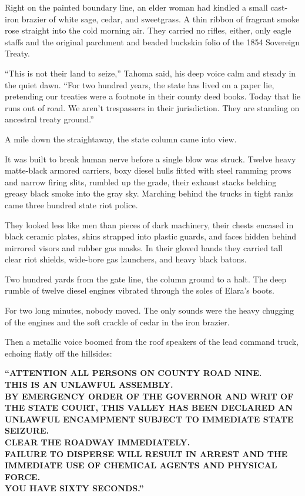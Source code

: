 Right on the painted boundary line, an elder woman had kindled a small cast-iron brazier of white sage, cedar, and sweetgrass. A thin ribbon of fragrant smoke rose straight into the cold morning air. They carried no rifles, either, only eagle staffs and the original parchment and beaded buckskin folio of the 1854 Sovereign Treaty.

``This is not their land to seize,'' Tahoma said, his deep voice calm and steady in the quiet dawn. ``For two hundred years, the state has lived on a paper lie, pretending our treaties were a footnote in their county deed books. Today that lie runs out of road. We aren't trespassers in their jurisdiction. They are standing on ancestral treaty ground.''

A mile down the straightaway, the state column came into view.

It was built to break human nerve before a single blow was struck. Twelve heavy matte-black armored carriers, boxy diesel hulls fitted with steel ramming prows and narrow firing slits, rumbled up the grade, their exhaust stacks belching greasy black smoke into the gray sky. Marching behind the trucks in tight ranks came three hundred state riot police. 

They looked less like men than pieces of dark machinery, their chests encased in black ceramic plates, shins strapped into plastic guards, and faces hidden behind mirrored visors and rubber gas masks. In their gloved hands they carried tall clear riot shields, wide-bore gas launchers, and heavy black batons.

Two hundred yards from the gate line, the column ground to a halt. The deep rumble of twelve diesel engines vibrated through the soles of Elara's boots. 

For two long minutes, nobody moved. The only sounds were the heavy chugging of the engines and the soft crackle of cedar in the iron brazier. 

Then a metallic voice boomed from the roof speakers of the lead command truck, echoing flatly off the hillsides:

\begin{center}
\textbf{``ATTENTION ALL PERSONS ON COUNTY ROAD NINE.}\\
\textbf{THIS IS AN UNLAWFUL ASSEMBLY.}\\
\textbf{BY EMERGENCY ORDER OF THE GOVERNOR AND WRIT OF THE STATE COURT, THIS VALLEY HAS BEEN DECLARED AN UNLAWFUL ENCAMPMENT SUBJECT TO IMMEDIATE STATE SEIZURE.}\\
\textbf{CLEAR THE ROADWAY IMMEDIATELY.}\\
\textbf{FAILURE TO DISPERSE WILL RESULT IN ARREST AND THE IMMEDIATE USE OF CHEMICAL AGENTS AND PHYSICAL FORCE.}\\
\textbf{YOU HAVE SIXTY SECONDS.''}
\end{center}

